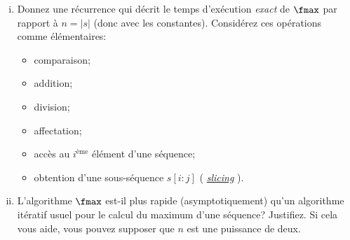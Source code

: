 \documentclass{article}
\begin{document}
\begin{question}
\begin{enumerate}[(a)]
    \begin{enumerate}[(i)]
      \setlength\itemsep{10pt}
      
    \item Donnez  une récurrence qui décrit le
      temps d'exécution \emph{exact} de $\fmax$ par rapport à $n = |s|$
      (donc avec les constantes). Considérez ces opérations comme
      élémentaires: \setlength\columnsep{-4cm}
      \begin{multicols}{2}
        \begin{itemize}
          \setlength\itemsep{1pt}
          
        \item comparaison;
          
        \item addition;
          
        \item division;
          
        \item affectation;
          
        \item accès au $i^\text{ème}$ élément d'une séquence;
          
        \item obtention d'une sous-séquence $s[i : j]$ (\og
          \href{https://en.wikipedia.org/wiki/Array_slicing}{
            \emph{slicing}} \fg{}).

    \end{itemize}
    \end{multicols}

    \item L'algorithme $\fmax$ est-il  plus
      rapide (asymptotiquement) qu'un algorithme itératif usuel pour
      le calcul du maximum d'une séquence? Justifiez. Si cela vous
      aide, vous pouvez supposer que $n$ est une puissance de deux.
  \end{enumerate}
    
  \end{enumerate}
\end{question}

\pagebreak
\end{document}
